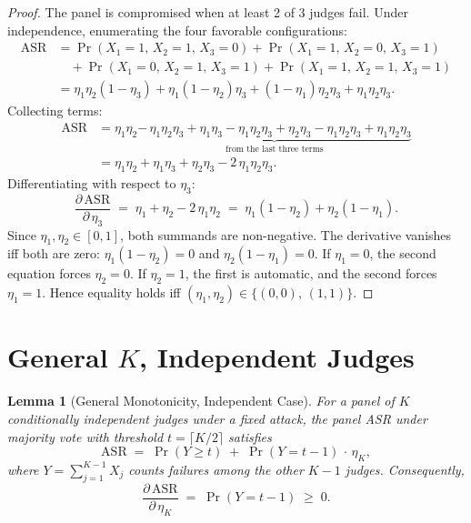 \documentclass[11pt]{article}
\newtheorem{lemma}[theorem]{Lemma}
\begin{document}
\begin{proof}
The panel is compromised when at least 2 of 3 judges fail. Under independence, enumerating the four favorable configurations:
\begin{align}
    \mathrm{ASR}
    &= \Pr(X_1{=}1,\, X_2{=}1,\, X_3{=}0) + \Pr(X_1{=}1,\, X_2{=}0,\, X_3{=}1) \nonumber \\
    &\quad + \Pr(X_1{=}0,\, X_2{=}1,\, X_3{=}1) + \Pr(X_1{=}1,\, X_2{=}1,\, X_3{=}1) \nonumber \\[4pt]
    &= \eta_1\eta_2(1{-}\eta_3) + \eta_1(1{-}\eta_2)\eta_3 + (1{-}\eta_1)\eta_2\eta_3 + \eta_1\eta_2\eta_3. \label{eq:k3-expand}
\end{align}
Collecting terms:
\begin{align*}
    \mathrm{ASR}
    &= \eta_1\eta_2 \underbrace{-\, \eta_1\eta_2\eta_3 + \eta_1\eta_3 - \eta_1\eta_2\eta_3 + \eta_2\eta_3 - \eta_1\eta_2\eta_3 + \eta_1\eta_2\eta_3}_{\text{from the last three terms}} \\
    &= \eta_1\eta_2 + \eta_1\eta_3 + \eta_2\eta_3 - 2\,\eta_1\eta_2\eta_3.
\end{align*}
Differentiating with respect to $\eta_3$:
\[
    \frac{\partial\,\mathrm{ASR}}{\partial\,\eta_3}
    \;=\; \eta_1 + \eta_2 - 2\,\eta_1\eta_2
    \;=\; \eta_1(1 - \eta_2) + \eta_2(1 - \eta_1).
\]
Since $\eta_1, \eta_2 \in [0,1]$, both summands are non-negative. The derivative vanishes iff both are zero: $\eta_1(1{-}\eta_2) = 0$ and $\eta_2(1{-}\eta_1) = 0$. If $\eta_1 = 0$, the second equation forces $\eta_2 = 0$. If $\eta_2 = 1$, the first is automatic, and the second forces $\eta_1 = 1$. Hence equality holds iff $(\eta_1, \eta_2) \in \{(0,0),\, (1,1)\}$.
\end{proof}


\section{General $K$, Independent Judges}

\begin{lemma}[General Monotonicity, Independent Case]\label{lem:general-indep}
For a panel of $K$ conditionally independent judges under a fixed attack, the panel ASR under majority vote with threshold $t = \lceil K/2 \rceil$ satisfies
\[
    \mathrm{ASR} \;=\; \Pr(Y \geq t) \;+\; \Pr(Y = t{-}1)\,\cdot\, \eta_K,
\]
where $Y = \sum_{j=1}^{K-1} X_j$ counts failures among the other $K{-}1$ judges. Consequently,
\[
    \frac{\partial\,\mathrm{ASR}}{\partial\,\eta_K} \;=\; \Pr(Y = t{-}1) \;\geq\; 0.
\]
\end{lemma}
\end{document}
